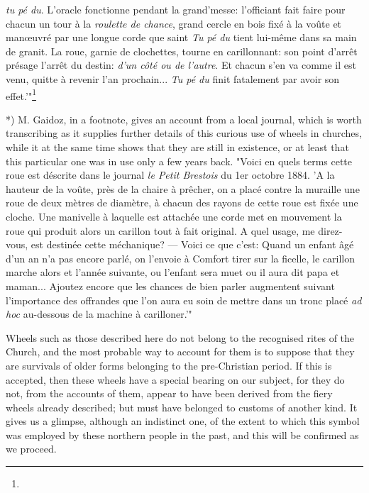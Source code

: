 \documentclass[a4paper, 11pt, oneside, polutonikogreek, english]{article}
\begin{document}
\emph{tu pé du}. L'oracle fonctionne pendant la grand'messe: l'officiant fait faire pour chacun un tour à la \emph{roulette de chance}, grand cercle en bois fixé à la voûte et manœuvré par une longue corde que saint \emph{Tu pé du} tient lui-même dans sa main de granit. La roue, garnie de clochettes, tourne en carillonnant: son point d'arrêt présage l'arrêt du destin: \emph{d'un côté ou de l'autre}. Et chacun s'en va comme il est venu, quitte à revenir l'an prochain... \emph{Tu pé du} finit fatalement par avoir son effet.'"\footnote{}

*) M. Gaidoz, in a footnote, gives an account from a local journal, which is worth transcribing as it supplies further details of this curious use of wheels in churches, while it at the same time shows that they are still in existence, or at least that this particular one was in use only a few years back. "Voici en quels terms cette roue est déscrite dans le journal \emph{le Petit Brestois} du 1er octobre 1884. 'A la hauteur de la voûte, près de la chaire à prêcher, on a placé contre la muraille une roue de deux mètres de diamètre, à chacun des rayons de cette roue est fixée une cloche. Une manivelle à laquelle est attachée une corde met en mouvement la roue qui produit alors un carillon tout à fait original. A quel usage, me direz-vous, est destinée cette méchanique? --- Voici ce que c'est: Quand un enfant âgé d'un an n'a pas encore parlé, on l'envoie à Comfort tirer sur la ficelle, le carillon marche alors et l'année suivante, ou l'enfant sera muet ou il aura dit papa et maman... Ajoutez encore que les chances de bien parler augmentent suivant l'importance des offrandes que l'on aura eu soin de mettre dans un tronc placé \emph{ad hoc} au-dessous de la machine à carilloner.'"

Wheels such as those described here do not belong to the recognised rites of the Church, and the most probable way to account for them is to suppose that they are survivals of older forms belonging to the pre-Christian period. If this is accepted, then these wheels have a special bearing on our subject, for they do not, from the accounts of them, appear to have been derived from the fiery wheels already described; but must have belonged to customs of another kind. It gives us a glimpse, although an indistinct one, of the extent to which this symbol was employed by these northern people in the past, and this will be confirmed as we proceed.
\end{document}
